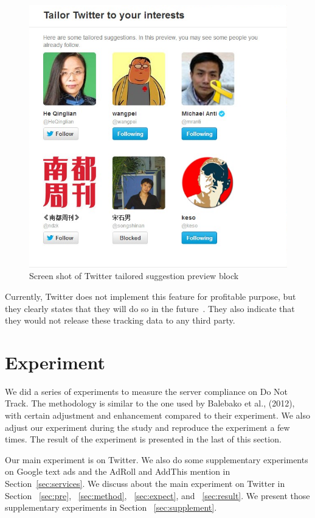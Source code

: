 \documentclass{sig-alternate}
\begin{document}
\begin{figure}
\begin{center}
\includegraphics[width=0.9\columnwidth]{tailored}
\end{center}
\caption{Screen shot of Twitter tailored suggestion preview block}
\label{fig:tailored}
\end{figure}


Currently, Twitter does not implement this feature for profitable purpose, but they clearly states that they will do so in the future~\cite{twitterfaq}. They also indicate that they would not release these tracking data to any third party.

\section{Experiment} \label{sec:experiment}

We did a series of experiments to measure the server compliance on Do Not Track. The methodology is similar to the one used by Balebako et al., (2012), with certain adjustment and enhancement compared to their experiment. We also adjust our experiment during the study and reproduce the experiment a few times. The result of the experiment is presented in the last of this section.

Our main experiment is on Twitter. We also do some supplementary experiments on Google text ads and the AdRoll and AddThis mention in Section~\ref{sec:services}. We discuss about the main experiment on Twitter in Section ~\ref{sec:pre}, ~\ref{sec:method}, ~\ref{sec:expect}, and ~\ref{sec:result}. We present those supplementary experiments in Section ~\ref{sec:supplement}. 
\end{document}
